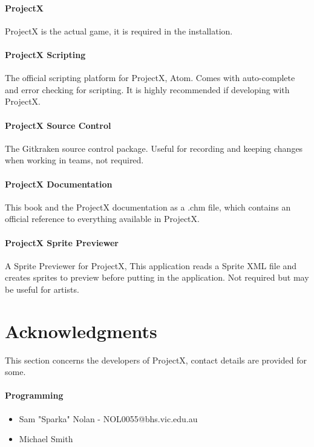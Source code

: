 \documentclass{book}
\begin{document}
	\paragraph{ProjectX}
	ProjectX is the actual game, it is required in the installation.
	
	\paragraph{ProjectX Scripting}
	The official scripting platform for ProjectX, Atom. Comes with auto-complete and error checking for scripting. It is highly recommended if developing with ProjectX.
	
	\paragraph{ProjectX Source Control}
	The Gitkraken source control package. Useful for recording and keeping changes when working in teams, not required.
	
	\paragraph{ProjectX Documentation}
	This book and the ProjectX documentation as a .chm file, which contains an official reference to everything available in ProjectX.
	
	\paragraph{ProjectX Sprite Previewer}
	A Sprite Previewer for ProjectX, This application reads a Sprite XML file  and creates sprites to preview before putting in the application. Not required but may be useful for artists.
	
	\section{Acknowledgments}
	This section concerns the developers of ProjectX, contact details are provided for some.
	
	\paragraph{Programming}
	\begin{itemize}
		\item Sam "Sparka" Nolan - NOL0055@bhs.vic.edu.au
		\item Michael Smith
	\end{itemize}
	
\end{document}
